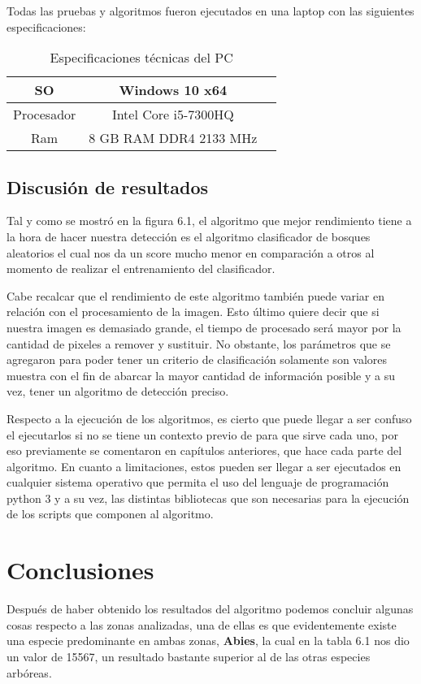 Todas las pruebas y algoritmos fueron ejecutados en una laptop con las siguientes especificaciones:

\begin{table}[H]
	{\centering
		\begin{tabular}{|c|c|c|}
			\hline
			SO & Windows 10 x64\\
			\hline
			Procesador & Intel Core i5-7300HQ\\
			\hline
			Ram & 8 GB RAM DDR4 2133 MHz\\
			\hline
		\end{tabular}
	\caption{Especificaciones técnicas del PC}
	\label{tab:Especificaciones técnicas del PC}
	}
\end{table}

\break

\section{Discusión de resultados}
Tal y como se mostró en la figura 6.1, el algoritmo que mejor rendimiento tiene a la hora de hacer nuestra detección es el algoritmo clasificador de bosques aleatorios el cual nos da un score mucho menor en comparación a otros al momento de realizar el entrenamiento del clasificador.

Cabe recalcar que el rendimiento de este algoritmo también puede variar en relación con el procesamiento de la imagen. Esto último quiere decir que si nuestra imagen es demasiado grande, el tiempo de procesado será mayor por la cantidad de pixeles a remover y sustituir. 
No obstante, los parámetros que se agregaron para poder tener un criterio de clasificación solamente son valores muestra con el fin de abarcar la mayor cantidad de información posible y a su vez, tener un algoritmo de detección preciso.

Respecto a la ejecución de los algoritmos, es cierto que puede llegar a ser confuso el ejecutarlos si no se tiene un contexto previo de para que sirve cada uno, por eso previamente se comentaron en capítulos anteriores, que hace cada parte del algoritmo. En cuanto a limitaciones, estos pueden ser llegar a ser ejecutados en cualquier sistema operativo que permita el uso del lenguaje de programación python 3 y a su vez, las distintas bibliotecas que son necesarias para la ejecución de los scripts que componen al algoritmo.


\chapter{Conclusiones}
Después de haber obtenido los resultados del algoritmo podemos concluir algunas cosas respecto a las zonas analizadas, una de ellas es que evidentemente existe una especie predominante en ambas zonas, \textbf{Abies}, la cual en la tabla 6.1 nos dio un valor de 15567, un resultado bastante superior al de las otras especies arbóreas.

